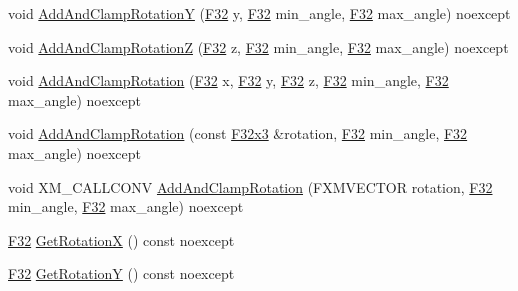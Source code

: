 \begin{DoxyCompactItemize}
\item 
void \hyperlink{classmage_1_1_local_transform_a960e6f431f8962f7aee701c0af1dc9e0}{Add\+And\+Clamp\+RotationY} (\hyperlink{namespacemage_aa97e833b45f06d60a0a9c4fc22ae02c0}{F32} y, \hyperlink{namespacemage_aa97e833b45f06d60a0a9c4fc22ae02c0}{F32} min\+\_\+angle, \hyperlink{namespacemage_aa97e833b45f06d60a0a9c4fc22ae02c0}{F32} max\+\_\+angle) noexcept
\item 
void \hyperlink{classmage_1_1_local_transform_a324c338aa8a85a74145e5641f9c65c96}{Add\+And\+Clamp\+RotationZ} (\hyperlink{namespacemage_aa97e833b45f06d60a0a9c4fc22ae02c0}{F32} z, \hyperlink{namespacemage_aa97e833b45f06d60a0a9c4fc22ae02c0}{F32} min\+\_\+angle, \hyperlink{namespacemage_aa97e833b45f06d60a0a9c4fc22ae02c0}{F32} max\+\_\+angle) noexcept
\item 
void \hyperlink{classmage_1_1_local_transform_aa5c60513e379baae81f79cea835d1896}{Add\+And\+Clamp\+Rotation} (\hyperlink{namespacemage_aa97e833b45f06d60a0a9c4fc22ae02c0}{F32} x, \hyperlink{namespacemage_aa97e833b45f06d60a0a9c4fc22ae02c0}{F32} y, \hyperlink{namespacemage_aa97e833b45f06d60a0a9c4fc22ae02c0}{F32} z, \hyperlink{namespacemage_aa97e833b45f06d60a0a9c4fc22ae02c0}{F32} min\+\_\+angle, \hyperlink{namespacemage_aa97e833b45f06d60a0a9c4fc22ae02c0}{F32} max\+\_\+angle) noexcept
\item 
void \hyperlink{classmage_1_1_local_transform_aa6b68f4b531aa34113b8df652c0245d8}{Add\+And\+Clamp\+Rotation} (const \hyperlink{namespacemage_a73fbe0da4b8d5bc156bb8453e5b63a17}{F32x3} \&rotation, \hyperlink{namespacemage_aa97e833b45f06d60a0a9c4fc22ae02c0}{F32} min\+\_\+angle, \hyperlink{namespacemage_aa97e833b45f06d60a0a9c4fc22ae02c0}{F32} max\+\_\+angle) noexcept
\item 
void X\+M\+\_\+\+C\+A\+L\+L\+C\+O\+NV \hyperlink{classmage_1_1_local_transform_a00559d5316893be21c67d039a55d6d7f}{Add\+And\+Clamp\+Rotation} (F\+X\+M\+V\+E\+C\+T\+OR rotation, \hyperlink{namespacemage_aa97e833b45f06d60a0a9c4fc22ae02c0}{F32} min\+\_\+angle, \hyperlink{namespacemage_aa97e833b45f06d60a0a9c4fc22ae02c0}{F32} max\+\_\+angle) noexcept
\item 
\hyperlink{namespacemage_aa97e833b45f06d60a0a9c4fc22ae02c0}{F32} \hyperlink{classmage_1_1_local_transform_af60f86fbaa2dc4562d67100215a63a61}{Get\+RotationX} () const noexcept
\item 
\hyperlink{namespacemage_aa97e833b45f06d60a0a9c4fc22ae02c0}{F32} \hyperlink{classmage_1_1_local_transform_a7d6b4eba97d85e80dacb6dc663c17e9c}{Get\+RotationY} () const noexcept
\item 

\end{DoxyCompactItemize}
